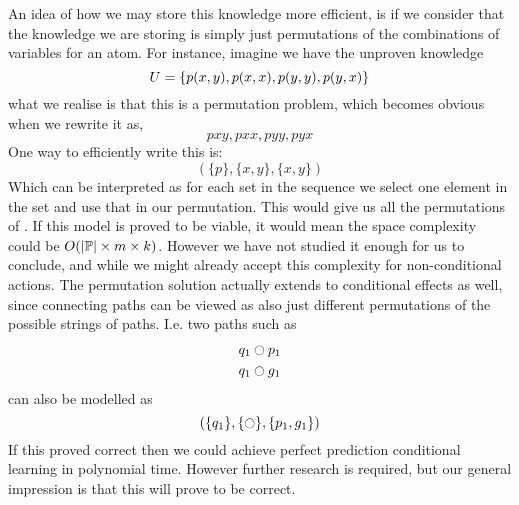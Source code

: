 \documentclass[../Master.tex]{subfiles}
\begin{document}
An idea of how we may store this knowledge more efficient, is if we consider that the knowledge we are storing is simply just permutations of the combinations of variables for an atom.
For instance, imagine we have the unproven knowledge
 \begin{equation*}
	U = \{ p(x,y), p(x,x), p(y,y), p(y,x) \}
 \end{equation*} 
 what we realise is that this is a permutation problem, which becomes obvious when we rewrite it as,
 \begin{equation}\label{eq:dis:sc:perms}
 	pxy, pxx, pyy, pyx 
 \end{equation} 
 One way to efficiently write this is:
  \begin{equation*}
  	(\{p\},\{x,y\},\{x,y\}) 
  \end{equation*} 
 Which can be interpreted as for each set in the sequence we select one element in the set and use that in our permutation.
 This would give us all the permutations of . 
 If this model is proved to be viable, it would mean the space complexity could be $O(|\mathbb{P}| \times m \times k)$. 
 However we have not studied it enough for us to conclude,
 and while we might already accept this complexity for non-conditional actions. 
 The permutation solution actually extends to conditional effects as well, since connecting paths can be viewed as also just different permutations of the possible strings of paths.
 I.e. two paths such as 
 \begin{align*}
	q_1 &\ocircle p_1 \\
	q_1 &\ocircle g_1
 \end{align*} 
 can also be modelled as
 \begin{equation*}
 	(\{q_1\},\{\ocircle\},\{p_1,g_1\}) 
 \end{equation*} 
If this proved correct then we could achieve perfect prediction conditional learning in polynomial time. However further research is required, but our general impression is that this will prove to be correct.
\end{document}
